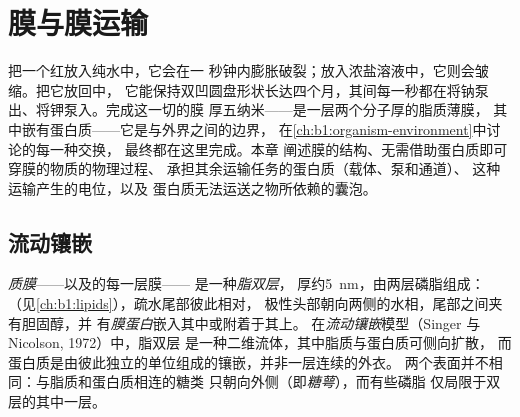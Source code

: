 \chapter{膜与膜运输}\label{ch:b1:membranes-transport}

把一个红放入纯水中，它会在一
秒钟内膨胀破裂；放入浓盐溶液中，它则会皱缩。把它放回中，
它能保持双凹圆盘形状长达四个月，其间每一秒都在将钠泵出、将钾泵入。完成这一切的膜
厚五纳米——是一层两个分子厚的脂质薄膜，
其中嵌有蛋白质——它是与外界之间的边界，
在\cref{ch:b1:organism-environment}中讨论的每一种交换，
最终都在这里完成。本章
阐述膜的结构、无需借助蛋白质即可穿膜的物质的物理过程、
承担其余运输任务的蛋白质（载体、泵和通道）、
这种运输产生的电位，以及
蛋白质无法运送之物所依赖的囊泡。

\section{流动镶嵌}

\begin{definition}[质膜]\label{def:b1:membranes-transport:membrane}
\emph{质膜}——以及的每一层膜——
是一种\emph{脂双层}，
厚约\qty{5}{nm}，由两层磷脂组成：
（见\cref{ch:b1:lipids}），疏水尾部彼此相对，
极性头部朝向两侧的水相，尾部之间夹有胆固醇，并
有\emph{膜蛋白}嵌入其中或附着于其上。
在\emph{流动镶嵌}模型（Singer 与 Nicolson, 1972）中，脂双层
是一种二维流体，其中脂质与蛋白质可侧向扩散，
而蛋白质是由彼此独立的单位组成的镶嵌，并非一层连续的外衣。
两个表面并不相同：与脂质和蛋白质相连的糖类
只朝向外侧（即\emph{糖萼}），而有些磷脂
仅局限于双层的其中一层。
\end{definition}

